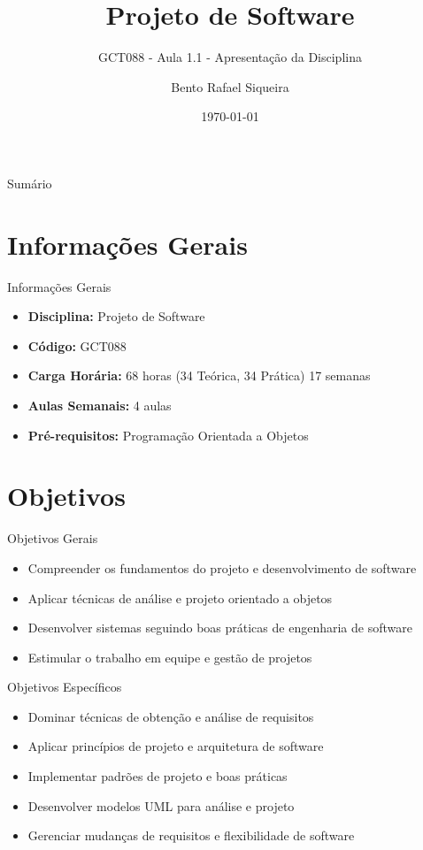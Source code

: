 \documentclass[aspectratio=169]{beamer}
\title{Projeto de Software}
\subtitle{GCT088 - Aula 1.1 - Apresentação da Disciplina}
\author{Bento Rafael Siqueira}
\institute{Universidade Federal de Lavras (UFLA)}
\date{\today}
\begin{document}
\begin{frame}
\titlepage
\end{frame}

\begin{frame}{Sumário}
\tableofcontents
\end{frame}

\section{Informações Gerais}

\begin{frame}{Informações Gerais}
\begin{itemize}
    \item \textbf{Disciplina:} Projeto de Software
    \item \textbf{Código:} GCT088
    \item \textbf{Carga Horária:} 68 horas (34 Teórica, 34 Prática) 17 semanas
    \item \textbf{Aulas Semanais:} 4 aulas
    \item \textbf{Pré-requisitos:} Programação Orientada a Objetos
\end{itemize}
\end{frame}

\section{Objetivos}

\begin{frame}{Objetivos Gerais}
\begin{itemize}
    \item Compreender os fundamentos do projeto e desenvolvimento de software
    \item Aplicar técnicas de análise e projeto orientado a objetos
    \item Desenvolver sistemas seguindo boas práticas de engenharia de software
    \item Estimular o trabalho em equipe e gestão de projetos
\end{itemize}
\end{frame}

\begin{frame}{Objetivos Específicos}
\begin{itemize}
    \item Dominar técnicas de obtenção e análise de requisitos
    \item Aplicar princípios de projeto e arquitetura de software
    \item Implementar padrões de projeto e boas práticas
    \item Desenvolver modelos UML para análise e projeto
    \item Gerenciar mudanças de requisitos e flexibilidade de software
\end{itemize}
\end{frame}
\end{document}

